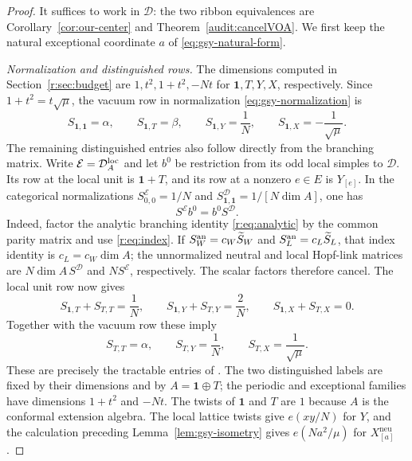 \documentclass[11pt,a4paper]{article}
\numberwithin{equation}{section}
\theoremstyle{definition}\newtheorem{definition}[theorem]{Definition}
\theoremstyle{remark}\newtheorem{remark}[theorem]{Remark}
\newcommand{\one}{\mathbf1}\newcommand{\B}{\mathcal B}\newcommand{\W}{W_N}
\begin{document}
\begin{proof}
It suffices to work in $\mathcal D$: the two ribbon equivalences
are Corollary~\ref{cor:our-center} and
Theorem~\ref{audit:cancelVOA}. We first keep the natural exceptional
coordinate $a$ of \eqref{eq:gsy-natural-form}.

\emph{Normalization and distinguished rows.}
The dimensions computed in Section~\ref{r:sec:budget} are
$1,t^2,1+t^2,-Nt$ for $\one,T,Y,X$, respectively.
Since $1+t^2=t\sqrt\mu$, the vacuum row in normalization
\eqref{eq:gsy-normalization} is
\[
 S_{\one,\one}=\alpha,\qquad S_{\one,T}=\beta,\qquad
 S_{\one,Y}=\frac1N,\qquad S_{\one,X}=-\frac1{\sqrt\mu}.
\]
The remaining distinguished entries also follow directly from the
branching matrix. Write $\mathcal E=\mathcal D_A^{\mathrm{loc}}$ and let
$b^0$ be restriction from its odd local simples to $\mathcal D$.
Its row at the local unit is $\one+T$, and its row at a nonzero
$e\in E$ is $Y_{[e]}$. In the categorical normalizations
$S^{\mathcal E}_{0,0}=1/N$ and
$S^{\mathcal D}_{\one,\one}=1/[N\dim A]$, one has
\[
              S^{\mathcal E}b^0=b^0S^{\mathcal D}.
\]
Indeed, factor the analytic branching identity
\eqref{r:eq:analytic} by the common parity matrix and use
\eqref{r:eq:index}. If $S_W^{\rm an}=c_W\widetilde S_W$ and
$S_L^{\rm an}=c_L\widetilde S_L$, that index identity is
$c_L=c_W\dim A$; the unnormalized neutral and local Hopf-link
matrices are $N\dim A\,S^{\mathcal D}$ and
$N S^{\mathcal E}$, respectively. The scalar factors therefore
cancel. The local unit row now gives
\[
 S_{\one,T}+S_{T,T}=\frac1N,\qquad
 S_{\one,Y}+S_{T,Y}=\frac2N,\qquad
 S_{\one,X}+S_{T,X}=0.
\]
Together with the vacuum row these imply
\[
 S_{T,T}=\alpha,\qquad S_{T,Y}=\frac1N,\qquad
 S_{T,X}=\frac1{\sqrt\mu}.
\]
These are precisely the tractable entries of
\cite[Section 5.1]{gsy}. The two distinguished labels are fixed by
their dimensions and by $A=\one\oplus T$; the periodic and
exceptional families have dimensions $1+t^2$ and $-Nt$.
The twists of $\one$ and $T$ are $1$ because $A$ is the conformal
extension algebra. The local lattice twists give $e(xy/N)$ for $Y$,
and the calculation preceding Lemma~\ref{lem:gsy-isometry} gives
$e(Na^2/\mu)$ for $X^{\mathrm{neu}}_{[a]}$.


\end{proof}
\end{document}
